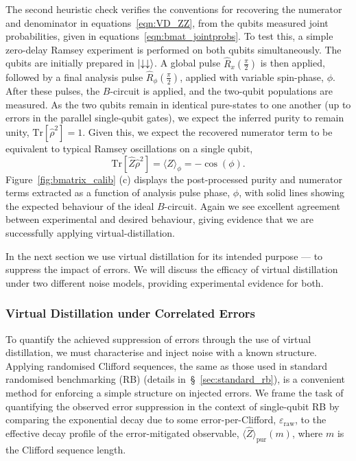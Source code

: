 The second heuristic check verifies the conventions for recovering the numerator
and denominator in equations~\ref{eqn:VD_ZZ}, from the qubits measured
joint probabilities, given in equations~\ref{eqn:bmat_jointprobs}. 
To test this, a simple zero-delay Ramsey experiment is performed on both
qubits simultaneously. The qubits are initially prepared in $\ket{\downarrow\downarrow}$. 
A global pulse $\hat R_x(\frac{\pi}{2})$ is then applied, followed by a final analysis pulse
$\hat R_\phi(\frac{\pi}{2})$, applied with variable spin-phase, $\phi$. After these
pulses, the $B$-circuit is applied, and the two-qubit populations are measured. 
As the two qubits remain in identical pure-states to one another (up to errors in the parallel single-qubit
 gates), we expect the inferred purity to remain unity,
$\mathrm{Tr}[\hat\rho^2]=1$. Given this, we expect the recovered numerator term to
be equivalent to typical Ramsey oscillations on a single qubit,
\begin{equation}
    \mathrm{Tr}[\hat Z \hat\rho^2] = \langle \hat Z \rangle_\phi = -\cos(\phi).
\end{equation}
Figure~\ref{fig:bmatrix_calib} (c) displays the post-processed purity and numerator terms extracted as a function of analysis pulse phase, $\phi$, with solid lines showing the expected behaviour of the ideal $B$-circuit. Again we see excellent agreement between experimental and desired behaviour, giving evidence that we are successfully applying virtual-distillation.

In the next section we use virtual distillation for its intended purpose --- to suppress the impact of errors. We will discuss the efficacy of virtual distillation under two different noise models, providing experimental evidence for both.

\subsubsection{Virtual Distillation under Correlated Errors}
\label{sec:vd_corr}

To quantify the achieved suppression of errors through the use of virtual
distillation, we must characterise and inject noise with a known structure. Applying randomised Clifford sequences, the same as those used in standard
randomised benchmarking (RB) (details in~\S~\ref{sec:standard_rb}), is a convenient method for enforcing a simple structure on injected errors.
We frame the task of quantifying the observed error suppression in the context of
single-qubit RB by comparing the exponential decay due to some
error-per-Clifford, $\varepsilon_\mathrm{raw}$, to the effective decay profile
of the error-mitigated observable, $\langle \hat Z\rangle_\mathrm{pur}(m)$, where $m$ is the Clifford sequence length.

